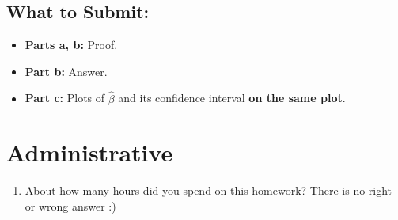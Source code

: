 \documentclass{article}
\begin{document}
\begin{bprob}
\begin{enumerate}
        
        
    \end{enumerate}

    \subsection*{What to Submit:}
    \begin{itemize}
        \item \textbf{Parts a, b:} Proof.
        \item \textbf{Part b:} Answer.
        \item \textbf{Part c:} Plots of $\hat{\beta}$ and its confidence interval \textbf{on the same plot}.
    \end{itemize}
\end{bprob}


\section*{Administrative}
\begin{aprob}
\begin{enumerate}
    \item {} About how many hours did you spend on this homework? There is no right or wrong answer :)
\end{enumerate}

\end{aprob}
\end{document}

